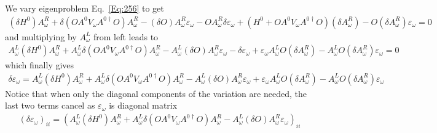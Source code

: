 \documentclass[aps,prb,floatfix,epsfig,singlecolumn,showpacs,preprintnumbers]{revtex4}
\begin{document}
We vary eigenproblem Eq.~\ref{Eq:256} to get
\begin{eqnarray}
(\delta H^0)A^R_\omega + \delta(O A^0 V_\omega A^{0\dagger} O)A^R_\omega 
- (\delta  O) A^R_\omega\varepsilon_\omega 
- O A^R_\omega  \delta\varepsilon_\omega + 
(H^0 + O A^0 V_\omega A^{0\dagger} O) (\delta  A^R_\omega) 
- O (\delta A^R_\omega)\varepsilon_\omega=0
\end{eqnarray}
and multiplying by $A^L_\omega$ from left leads to
\begin{eqnarray}
A^L_\omega(\delta H^0)A^R_\omega + A^L_\omega\delta(O A^0 V_\omega A^{0\dagger} O)A^R_\omega 
- A^L_\omega(\delta  O) A^R_\omega\varepsilon_\omega 
- \delta\varepsilon_\omega
+\varepsilon_\omega A^L_\omega O (\delta  A^R_\omega) 
- A^L_\omega O (\delta A^R_\omega)\varepsilon_\omega=0
\end{eqnarray}
which finally gives
\begin{eqnarray}
\delta\varepsilon_\omega =A^L_\omega(\delta H^0)A^R_\omega + A^L_\omega\delta(O A^0 V_\omega A^{0\dagger} O)A^R_\omega 
- A^L_\omega(\delta  O) A^R_\omega\varepsilon_\omega 
+\varepsilon_\omega A^L_\omega O (\delta  A^R_\omega) 
- A^L_\omega O (\delta A^R_\omega)\varepsilon_\omega
\end{eqnarray}
Notice that when only the diagonal components of the variation are
needed, the last two terms cancel as $\varepsilon_\omega$ is diagonal
matrix
\begin{eqnarray}
(\delta\varepsilon_\omega)_{ii} = (A^L_\omega(\delta H^0)A^R_\omega + A^L_\omega\delta(O A^0 V_\omega A^{0\dagger} O)A^R_\omega 
- A^L_\omega(\delta  O) A^R_\omega\varepsilon_\omega )_{ii}
\label{Eq:260}
\end{eqnarray}
\end{document}
